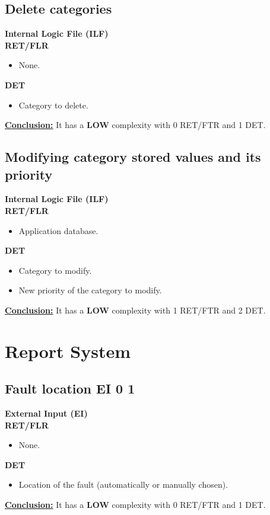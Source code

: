 \subsection{Delete categories}
\textbf{Internal Logic File (ILF)} \\ 
\textbf{RET/FLR}
\begin{itemize}
\item None.
\end{itemize}
\textbf{DET}
\begin{itemize}
\item Category to delete.
\end{itemize}
\textbf{\underline{Conclusion:}} It has a \textbf{LOW} complexity with 0 RET/FTR and 1 DET.

\subsection{Modifying category stored values and its priority}
\textbf{Internal Logic File (ILF)} \\ 
\textbf{RET/FLR}
\begin{itemize}
\item Application database.
\end{itemize}
\textbf{DET}
\begin{itemize}
\item Category to modify.
\item New priority of the category to modify.
\end{itemize}
\textbf{\underline{Conclusion:}} It has a \textbf{LOW} complexity with 1 RET/FTR and 2 DET.	



\section{Report System}



\subsection{Fault location	EI	0	1}
\textbf{External Input (EI)} \\ 
\textbf{RET/FLR}
\begin{itemize}
\item None.
\end{itemize}
\textbf{DET}
\begin{itemize}
\item Location of the fault (automatically or manually chosen).
\end{itemize}
\textbf{\underline{Conclusion:}} It has a \textbf{LOW} complexity with 0 RET/FTR and 1 DET.

